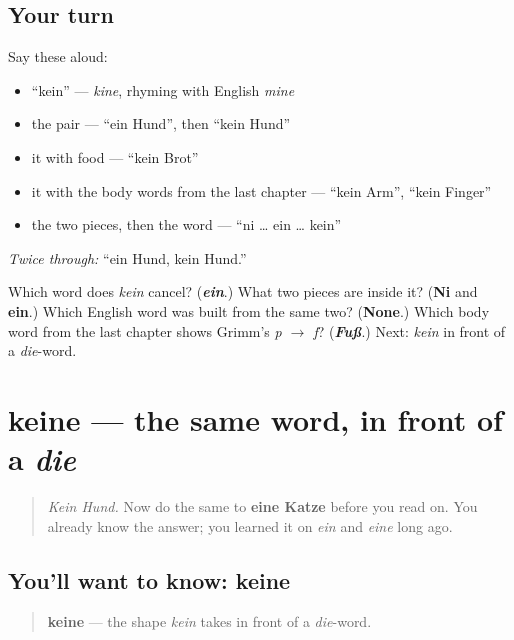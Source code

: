 \subsection*{Your turn}
Say these aloud:

\begin{itemize}
\raggedright
  \item \textquotedblleft{}kein\textquotedblright{} — \emph{kine}, rhyming with English \emph{mine}
  \item the pair — \textquotedblleft{}ein Hund\textquotedblright{}, then \textquotedblleft{}kein Hund\textquotedblright{}
  \item it with food — \textquotedblleft{}kein Brot\textquotedblright{}
  \item it with the body words from the last chapter — \textquotedblleft{}kein Arm\textquotedblright{}, \textquotedblleft{}kein Finger\textquotedblright{}
  \item the two pieces, then the word — \textquotedblleft{}ni … ein … kein\textquotedblright{}
\end{itemize}

\emph{Twice through:} \textquotedblleft{}ein Hund, kein Hund.\textquotedblright{}

\begin{tcolorbox}[breakable,colback=teal!4,colframe=teal!35!black,title={Before you move on}]
Which word does \emph{kein} cancel? (\emph{\textbf{ein}}.) What two pieces are inside it? (\textbf{Ni} and \textbf{ein}.) Which English word was built from the same two? (\textbf{None}.) Which body word from the last chapter shows Grimm's \emph{p $\to$ f}? (\emph{\textbf{Fuß}}.) Next: \emph{kein} in front of a \emph{die}-word.
\end{tcolorbox}
\section[keine]{keine — the same word, in front of a \emph{die}}

\label{lesson:GE-C32-keine}



\begin{quote}
\emph{Kein Hund.} Now do the same to \textbf{eine Katze} before you read on. You already know the answer; you learned it on \emph{ein} and \emph{eine} long ago.
\end{quote}

\subsection*{You'll want to know: keine}
\begin{quote}
\textbf{keine} — the shape \emph{kein} takes in front of a \emph{die}-word.
\end{quote}

